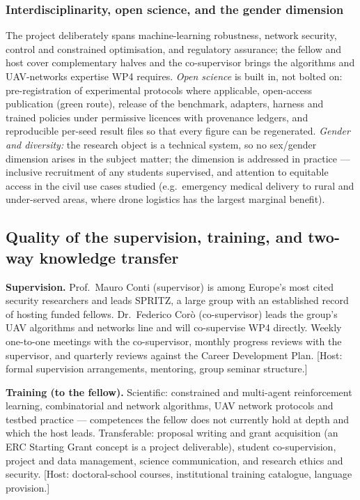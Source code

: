 \documentclass[11pt,a4paper]{article}
\begin{document}
\subsubsection{Interdisciplinarity, open science, and the gender dimension}
The project deliberately spans machine-learning robustness, network security, control and constrained optimisation, and regulatory assurance; the fellow and host cover complementary halves and the co-supervisor brings the algorithms and UAV-networks expertise WP4 requires. \emph{Open science} is built in, not bolted on: pre-registration of experimental protocols where applicable, open-access publication (green route), release of the benchmark, adapters, harness and trained policies under permissive licences with provenance ledgers, and reproducible per-seed result files so that every figure can be regenerated. \emph{Gender and diversity:} the research object is a technical system, so no sex/gender dimension arises in the subject matter; the dimension is addressed in practice --- inclusive recruitment of any students supervised, and attention to equitable access in the civil use cases studied (e.g.\ emergency medical delivery to rural and under-served areas, where drone logistics has the largest marginal benefit).

\subsection{Quality of the supervision, training, and two-way knowledge transfer}
\textbf{Supervision.} Prof.\ Mauro Conti (supervisor) is among Europe's most cited security researchers and leads SPRITZ, a large group with an established record of hosting funded fellows. Dr.\ Federico Cor\`o (co-supervisor) leads the group's UAV algorithms and networks line and will co-supervise WP4 directly. Weekly one-to-one meetings with the co-supervisor, monthly progress reviews with the supervisor, and quarterly reviews against the Career Development Plan. [Host: formal supervision arrangements, mentoring, group seminar structure.]

\textbf{Training (to the fellow).} Scientific: constrained and multi-agent reinforcement learning, combinatorial and network algorithms, UAV network protocols and testbed practice --- competences the fellow does not currently hold at depth and which the host leads. Transferable: proposal writing and grant acquisition (an ERC Starting Grant concept is a project deliverable), student co-supervision, project and data management, science communication, and research ethics and security. [Host: doctoral-school courses, institutional training catalogue, language provision.]
\end{document}
